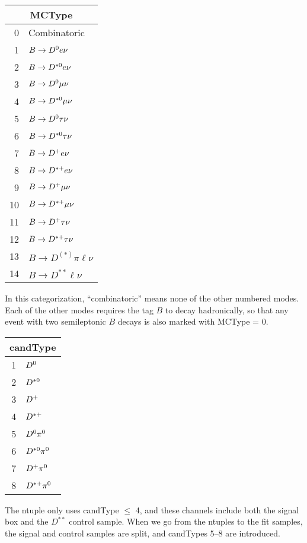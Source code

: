 \documentclass[10pt,twocolumn]{article}
\begin{document}
 



\begin{tabular}{r l}\\ \hline\hline
\multicolumn{2}{c}{\bf MCType}\\ \hline
0 & Combinatoric\\
1 & $B\rightarrow D^0 e\nu$\\
2 & $B\rightarrow D^{*0} e\nu$\\
3 & $B\rightarrow D^0\mu\nu$\\
4 & $B\rightarrow D^{*0}\mu\nu$\\
5 & $B\rightarrow D^0\tau\nu$\\
6 & $B\rightarrow D^{*0}\tau\nu$\\
7 & $B\rightarrow D^+ e\nu$\\
8 & $B\rightarrow D^{*+} e\nu$\\
9 & $B\rightarrow D^+\mu\nu$\\
10 & $B\rightarrow D^{*+}\mu\nu$\\
11 & $B\rightarrow D^+\tau\nu$\\
12 & $B\rightarrow D^{*+}\tau\nu$\\
13 & $B\to D^{(*)}\pi\ell\nu$\\
14 & $B\to D^{**}\ell\nu$\\ \hline\hline
\end{tabular}

\noindent In this categorization, ``combinatoric'' means none of
the other numbered modes. Each of the other modes requires
the tag $B$ to decay hadronically, so that any event with
two semileptonic $B$ decays is also marked with MCType = 0.

\begin{tabular}{r l}\\ \hline\hline
\multicolumn{2}{c}{\bf candType}\\ \hline
1 & $D^0$\\
2 & $D^{*0}$\\
3 & $D^+$\\
4 & $D^{*+}$\\
5 & $D^0\pi^0$\\
6 & $D^{*0}\pi^0$\\
7 & $D^+\pi^0$\\
8 & $D^{*+}\pi^0$\\ \hline\hline
\end{tabular}

\noindent The ntuple only uses candType $\le$ 4, and
these channels include both the signal box and the
$D^{**}$ control sample. When we go from the ntuples
to the fit samples, the signal and control samples
are split, and candTypes 5--8 are introduced.
\end{document}
